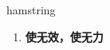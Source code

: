 
\begin{frame}
{\huge hamstring}
\begin{center}
\begin{enumerate}\Large
  \item \textbf{使无效，使无力}
\end{enumerate}
\end{center}
\end{frame}
